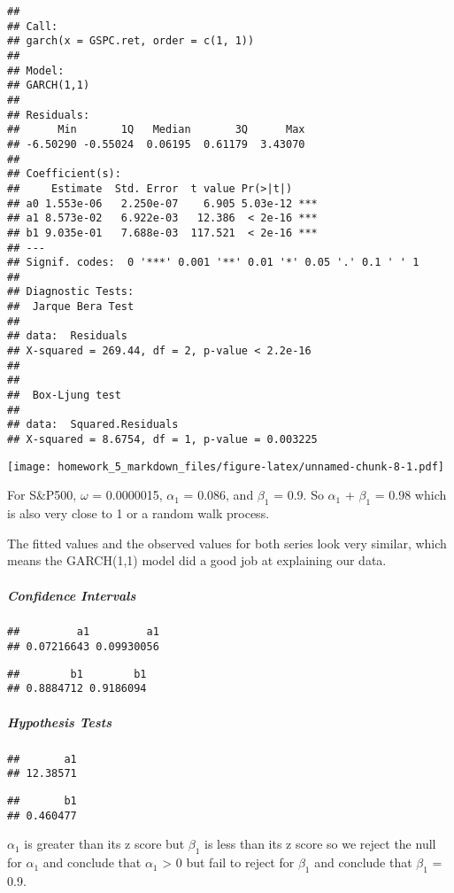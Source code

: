 \documentclass[]{article}
\let\oldsubparagraph\subparagraph
\renewcommand{\subparagraph}[1]{\oldsubparagraph{#1}\mbox{}}
\begin{document}
\begin{verbatim}
## 
## Call:
## garch(x = GSPC.ret, order = c(1, 1))
## 
## Model:
## GARCH(1,1)
## 
## Residuals:
##      Min       1Q   Median       3Q      Max 
## -6.50290 -0.55024  0.06195  0.61179  3.43070 
## 
## Coefficient(s):
##     Estimate  Std. Error  t value Pr(>|t|)    
## a0 1.553e-06   2.250e-07    6.905 5.03e-12 ***
## a1 8.573e-02   6.922e-03   12.386  < 2e-16 ***
## b1 9.035e-01   7.688e-03  117.521  < 2e-16 ***
## ---
## Signif. codes:  0 '***' 0.001 '**' 0.01 '*' 0.05 '.' 0.1 ' ' 1
## 
## Diagnostic Tests:
##  Jarque Bera Test
## 
## data:  Residuals
## X-squared = 269.44, df = 2, p-value < 2.2e-16
## 
## 
##  Box-Ljung test
## 
## data:  Squared.Residuals
## X-squared = 8.6754, df = 1, p-value = 0.003225
\end{verbatim}

\texttt{[image: homework\_5\_markdown\_files/figure-latex/unnamed-chunk-8-1.pdf]}

For S\&P500, \(\omega\) = 0.0000015, \(\alpha_1\) = 0.086, and
\(\beta_1\) = 0.9. So \(\alpha_1\) + \(\beta_1\) = 0.98 which is also
very close to 1 or a random walk process.

The fitted values and the observed values for both series look very
similar, which means the GARCH(1,1) model did a good job at explaining
our data.

\subparagraph{Confidence Intervals}\label{confidence-intervals-1}

\begin{verbatim}
##         a1         a1 
## 0.07216643 0.09930056
\end{verbatim}

\begin{verbatim}
##        b1        b1 
## 0.8884712 0.9186094
\end{verbatim}

\subparagraph{Hypothesis Tests}\label{hypothesis-tests-1}

\begin{verbatim}
##       a1 
## 12.38571
\end{verbatim}

\begin{verbatim}
##       b1 
## 0.460477
\end{verbatim}

\(\alpha_1\) is greater than its z score but \(\beta_1\) is less than
its z score so we reject the null for \(\alpha_1\) and conclude that
\(\alpha_1\) \textgreater{} 0 but fail to reject for \(\beta_1\) and
conclude that \(\beta_1\) = 0.9.
\end{document}
